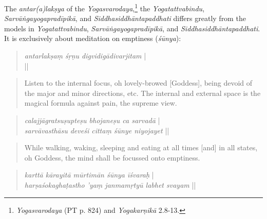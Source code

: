 The \textit{antar(a)lakṣya} of the \textit{Yogasvarodaya},\footnote{\textit{Yogasvarodaya} (PT p. 824) and \textit{Yogakarṇikā} 2.8-13.} the \textit{Yogatattvabindu}, \textit{Sarvāṅgayogapradīpikā}, and \textit{Siddhasiddhāntapaddhati} differs greatly from the models in \textit{Yogatattvabindu}, \textit{Sarvāṅgayogapradīpikā}, and \textit{Siddhasiddhāntapaddhati}. It is exclusively about meditation on emptiness (\textit{śūnya}): 

\label{antarsvayotrans}
  \begin{quote}
    \begin{ekdosis}
    \textit{
  antarlakṣaṃ śṛṇu digvidigādivarjitam} |\\
\textit{
} ||
  \end{ekdosis}
\end{quote}
\begin{quote}
Listen to the internal focus, oh lovely-browed [Goddess], being devoid of the major and minor directions, etc. The internal and external space is the magical formula against pain, the supreme view.
\end{quote}
\begin{quote}
  \begin{ekdosis}
\textit{calajjāgratsuṣupteṣu bhojaneṣu ca sarvadā} |\\
\textit{sarvāvasthāsu deveśi cittaṃ śūnye niyojayet} ||
  \end{ekdosis}
\end{quote}
\begin{quote}
While walking, waking, sleeping and eating at all times
[and] in all states, oh Goddess, the mind shall be focussed onto emptiness.  
\end{quote}
\begin{quote}
  \begin{ekdosis}
    \textit{karttā kārayitā mūrtimān śūnya īśvaraḥ} |\\
    \textit{harṣaśokaghaṭastho ’yaṃ janmamṛtyū labhet svayam} ||
      \end{ekdosis}
\end{quote}
